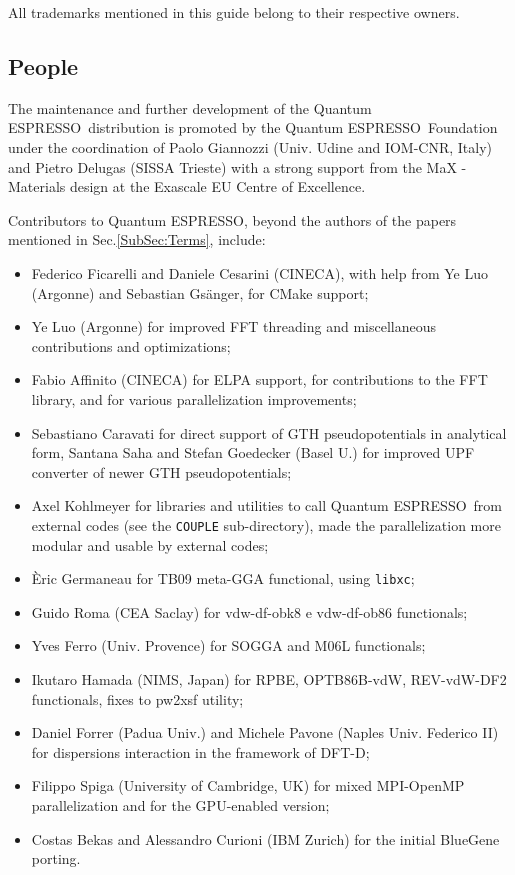 \documentclass[12pt,a4paper]{article}
\def\qe{{\sc Quantum ESPRESSO}}
\def\libxc{\texttt{libxc}}
\begin{document}
All trademarks mentioned in this guide belong to their respective owners.

\subsection{People}

The maintenance and further development of the \qe\ distribution
is promoted by the \qe\ Foundation under the coordination of
Paolo Giannozzi (Univ. Udine and IOM-CNR, Italy) and Pietro Delugas
(SISSA Trieste) with a strong support from the MaX - Materials design
at the Exascale EU Centre of Excellence.

Contributors to \qe, beyond the authors of the papers
mentioned in Sec.\ref{SubSec:Terms}, include:
\begin{itemize}
  \item Federico Ficarelli and Daniele Cesarini (CINECA), with help 
  from Ye Luo (Argonne) and Sebastian Gs\"anger, for CMake support;
  \item Ye Luo (Argonne) for improved FFT threading and miscellaneous
  contributions and optimizations;
  \item Fabio Affinito (CINECA) for ELPA support, for contributions
  to the FFT library, and for various parallelization improvements;
  \item Sebastiano Caravati for direct support of GTH pseudopotentials
  in analytical form, Santana Saha and Stefan Goedecker (Basel U.)
  for improved UPF converter of newer GTH pseudopotentials;
  \item Axel Kohlmeyer for libraries and utilities to call \qe\
  from external codes (see the \texttt{COUPLE} sub-directory), made the
  parallelization more modular and usable by external codes;
  \item \`Eric Germaneau for TB09 meta-GGA functional, using \libxc;
  \item Guido Roma (CEA Saclay) for  vdw-df-obk8  e vdw-df-ob86 functionals; 
  \item Yves Ferro (Univ. Provence) for SOGGA and M06L functionals; 
  \item Ikutaro Hamada (NIMS, Japan) for RPBE, OPTB86B-vdW, REV-vdW-DF2
	  functionals, fixes to pw2xsf utility;
  \item Daniel Forrer (Padua Univ.) and Michele Pavone
  (Naples Univ. Federico II) for dispersions interaction in the
  framework of DFT-D;
  \item Filippo Spiga (University of Cambridge, UK) for mixed MPI-OpenMP
  parallelization and for the GPU-enabled version;
  \item Costas Bekas and Alessandro Curioni (IBM Zurich) for the initial
  BlueGene porting.
\end{itemize}
\end{document}
